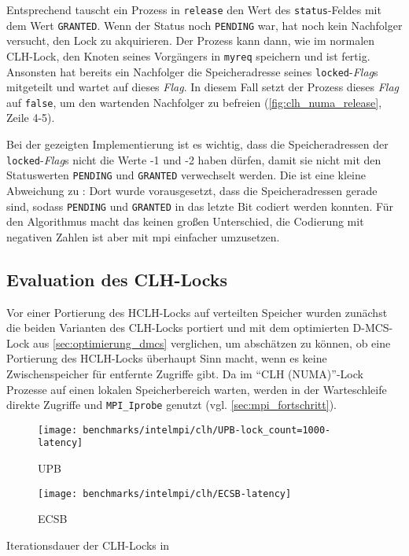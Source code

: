 Entsprechend tauscht ein Prozess in \texttt{release} den Wert des \texttt{status}-Feldes
mit dem Wert \texttt{GRANTED}.
Wenn der Status noch \texttt{PENDING} war,
hat noch kein Nachfolger versucht,
den Lock zu akquirieren.
Der Prozess kann dann,
wie im normalen CLH-Lock,
den Knoten seines Vorgängers in \texttt{myreq} speichern
und ist fertig.
Ansonsten hat bereits ein Nachfolger die Speicheradresse seines \texttt{locked}-\textit{Flag}s mitgeteilt
und wartet auf dieses \textit{Flag}.
In diesem Fall setzt der Prozess dieses \textit{Flag} auf \texttt{false},
um den wartenden Nachfolger zu befreien (\autoref{fig:clh_numa_release}, Zeile 4-5).

Bei der gezeigten Implementierung ist es wichtig,
dass die Speicheradressen der \texttt{locked}-\textit{Flag}s nicht die Werte -1 und -2 haben dürfen,
damit sie nicht mit den Statuswerten \texttt{PENDING} und \texttt{GRANTED} verwechselt werden.
Die ist eine kleine Abweichung zu \cite{C-Lock}:
Dort wurde vorausgesetzt,
dass die Speicheradressen gerade sind,
sodass \texttt{PENDING} und \texttt{GRANTED} in das letzte Bit codiert werden konnten.
Für den Algorithmus macht das keinen großen Unterschied,
die Codierung mit negativen Zahlen ist aber mit \gls{mpi} einfacher umzusetzen.

\subsection{Evaluation des CLH-Locks}
\label{sec:clh_evaluation}

Vor einer Portierung des HCLH-Locks auf verteilten Speicher
wurden zunächst die beiden Varianten des CLH-Locks portiert
und mit dem optimierten D-MCS-Lock aus \autoref{sec:optimierung_dmcs} verglichen,
um abschätzen zu können,
ob eine Portierung des HCLH-Locks überhaupt Sinn macht,
wenn es keine \gls{Zwischenspeicher} für entfernte Zugriffe gibt.
Da im \enquote{CLH (NUMA)}-Lock Prozesse auf einen lokalen Speicherbereich warten,
werden in der Warteschleife direkte Zugriffe und \texttt{MPI\_Iprobe} genutzt (vgl. \autoref{sec:mpi_fortschritt}).

\begin{benchmark}[h]
    \begin{subfigure}{.5\textwidth}
        \texttt{[image: benchmarks/intelmpi/clh/UPB-lock\_count=1000-latency]}
        \caption{UPB}
        \label{ben:clh_upb_latency}
    \end{subfigure}
    \begin{subfigure}{.5\textwidth}
        \texttt{[image: benchmarks/intelmpi/clh/ECSB-latency]}
        \caption{ECSB}
        \label{ben:clh_ecsb_latency}
    \end{subfigure}
    \caption{Iterationsdauer der CLH-Locks in }
    \label{ben:clh_upb_ecsb}
\end{benchmark}

